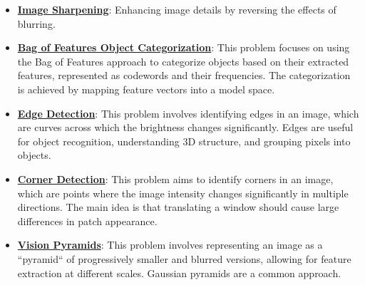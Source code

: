 \documentclass{article}%
\begin{document}
\begin{itemize}[leftmargin=*]
\item \href{https://purdue.brightspace.com/d2l/common/assets/pdfjs-d2l-dist/1.0.14-legacy/web/viewer.html?file=\%2Fcontent\%2Fenforced\%2F1095467-wl.202510.CS.24300.001\%2F07L2-Vision.pdf\%3Fou\%3D1095467\&lang=en-us\&container=d2l-fileviewer-rendered-pdf\&fullscreen=d2l-fileviewer-rendered-pdf-dialog\&height=667#page=52}{\textbf{Image Sharpening}}: Enhancing image details by reversing the effects of blurring.%
\end{itemize}%
\begin{itemize}[leftmargin=*]%
\item \href{https://purdue.brightspace.com/d2l/common/assets/pdfjs-d2l-dist/1.0.14-legacy/web/viewer.html?file=\%2Fcontent\%2Fenforced\%2F1095467-wl.202510.CS.24300.001\%2F08L2-Feature Extraction.pdf\%3Fou\%3D1095467\&lang=en-us\&container=d2l-fileviewer-rendered-pdf\&fullscreen=d2l-fileviewer-rendered-pdf-dialog\&height=667#page=3}{\textbf{Bag of Features Object Categorization}}: This problem focuses on using the Bag of Features approach to categorize objects based on their extracted features, represented as codewords and their frequencies. The categorization is achieved by mapping feature vectors into a model space.%
\item \href{https://purdue.brightspace.com/d2l/common/assets/pdfjs-d2l-dist/1.0.14-legacy/web/viewer.html?file=\%2Fcontent\%2Fenforced\%2F1095467-wl.202510.CS.24300.001\%2F08L2-Feature Extraction.pdf\%3Fou\%3D1095467\&lang=en-us\&container=d2l-fileviewer-rendered-pdf\&fullscreen=d2l-fileviewer-rendered-pdf-dialog\&height=667#page=4}{\textbf{Edge Detection}}: This problem involves identifying edges in an image, which are curves across which the brightness changes significantly. Edges are useful for object recognition, understanding 3D structure, and grouping pixels into objects.%
\item \href{https://purdue.brightspace.com/d2l/common/assets/pdfjs-d2l-dist/1.0.14-legacy/web/viewer.html?file=\%2Fcontent\%2Fenforced\%2F1095467-wl.202510.CS.24300.001\%2F08L2-Feature Extraction.pdf\%3Fou\%3D1095467\&lang=en-us\&container=d2l-fileviewer-rendered-pdf\&fullscreen=d2l-fileviewer-rendered-pdf-dialog\&height=667#page=20}{\textbf{Corner Detection}}: This problem aims to identify corners in an image, which are points where the image intensity changes significantly in multiple directions. The main idea is that translating a window should cause large differences in patch appearance.%
\item \href{https://purdue.brightspace.com/d2l/common/assets/pdfjs-d2l-dist/1.0.14-legacy/web/viewer.html?file=\%2Fcontent\%2Fenforced\%2F1095467-wl.202510.CS.24300.001\%2F08L2-Feature Extraction.pdf\%3Fou\%3D1095467\&lang=en-us\&container=d2l-fileviewer-rendered-pdf\&fullscreen=d2l-fileviewer-rendered-pdf-dialog\&height=667#page=30}{\textbf{Vision Pyramids}}: This problem involves representing an image as a ``pyramid`` of progressively smaller and blurred versions, allowing for feature extraction at different scales. Gaussian pyramids are a common approach.%
\end{itemize}%
\end{document}
